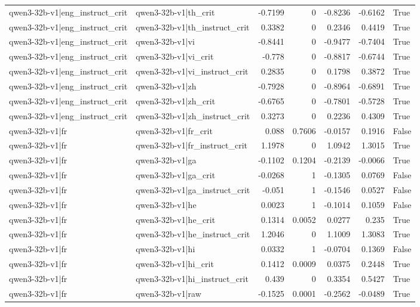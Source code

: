 \begin{table}
\begin{tabular}{l l r r r r l}
qwen3-32b-v1|eng_instruct_crit & qwen3-32b-v1|th_crit & -0.7199 & 0 & -0.8236 & -0.6162 & True \\
qwen3-32b-v1|eng_instruct_crit & qwen3-32b-v1|th_instruct_crit & 0.3382 & 0 & 0.2346 & 0.4419 & True \\
qwen3-32b-v1|eng_instruct_crit & qwen3-32b-v1|vi & -0.8441 & 0 & -0.9477 & -0.7404 & True \\
qwen3-32b-v1|eng_instruct_crit & qwen3-32b-v1|vi_crit & -0.778 & 0 & -0.8817 & -0.6744 & True \\
qwen3-32b-v1|eng_instruct_crit & qwen3-32b-v1|vi_instruct_crit & 0.2835 & 0 & 0.1798 & 0.3872 & True \\
qwen3-32b-v1|eng_instruct_crit & qwen3-32b-v1|zh & -0.7928 & 0 & -0.8964 & -0.6891 & True \\
qwen3-32b-v1|eng_instruct_crit & qwen3-32b-v1|zh_crit & -0.6765 & 0 & -0.7801 & -0.5728 & True \\
qwen3-32b-v1|eng_instruct_crit & qwen3-32b-v1|zh_instruct_crit & 0.3273 & 0 & 0.2236 & 0.4309 & True \\
qwen3-32b-v1|fr & qwen3-32b-v1|fr_crit & 0.088 & 0.7606 & -0.0157 & 0.1916 & False \\
qwen3-32b-v1|fr & qwen3-32b-v1|fr_instruct_crit & 1.1978 & 0 & 1.0942 & 1.3015 & True \\
qwen3-32b-v1|fr & qwen3-32b-v1|ga & -0.1102 & 0.1204 & -0.2139 & -0.0066 & True \\
qwen3-32b-v1|fr & qwen3-32b-v1|ga_crit & -0.0268 & 1 & -0.1305 & 0.0769 & False \\
qwen3-32b-v1|fr & qwen3-32b-v1|ga_instruct_crit & -0.051 & 1 & -0.1546 & 0.0527 & False \\
qwen3-32b-v1|fr & qwen3-32b-v1|he & 0.0023 & 1 & -0.1014 & 0.1059 & False \\
qwen3-32b-v1|fr & qwen3-32b-v1|he_crit & 0.1314 & 0.0052 & 0.0277 & 0.235 & True \\
qwen3-32b-v1|fr & qwen3-32b-v1|he_instruct_crit & 1.2046 & 0 & 1.1009 & 1.3083 & True \\
qwen3-32b-v1|fr & qwen3-32b-v1|hi & 0.0332 & 1 & -0.0704 & 0.1369 & False \\
qwen3-32b-v1|fr & qwen3-32b-v1|hi_crit & 0.1412 & 0.0009 & 0.0375 & 0.2448 & True \\
qwen3-32b-v1|fr & qwen3-32b-v1|hi_instruct_crit & 0.439 & 0 & 0.3354 & 0.5427 & True \\
qwen3-32b-v1|fr & qwen3-32b-v1|raw & -0.1525 & 0.0001 & -0.2562 & -0.0489 & True \\

\end{tabular}
\end{table}
